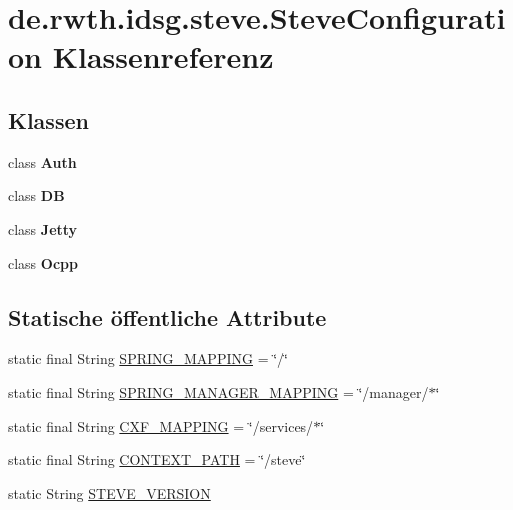 \hypertarget{classde_1_1rwth_1_1idsg_1_1steve_1_1_steve_configuration}{\section{de.\-rwth.\-idsg.\-steve.\-Steve\-Configuration Klassenreferenz}
\label{classde_1_1rwth_1_1idsg_1_1steve_1_1_steve_configuration}
}
\subsection*{Klassen}
\begin{DoxyCompactItemize}
\item 
class {\bfseries Auth}
\item 
class {\bfseries D\-B}
\item 
class {\bfseries Jetty}
\item 
class {\bfseries Ocpp}
\end{DoxyCompactItemize}
\subsection*{Statische öffentliche Attribute}
\begin{DoxyCompactItemize}
\item 
static final String \hyperlink{classde_1_1rwth_1_1idsg_1_1steve_1_1_steve_configuration_aecc681bfa1ab888ae98352bfc28f7384}{S\-P\-R\-I\-N\-G\-\_\-\-M\-A\-P\-P\-I\-N\-G} = \char`\"{}/\char`\"{}
\item 
static final String \hyperlink{classde_1_1rwth_1_1idsg_1_1steve_1_1_steve_configuration_ae72ad42b30d59ffc90be207c36a85479}{S\-P\-R\-I\-N\-G\-\_\-\-M\-A\-N\-A\-G\-E\-R\-\_\-\-M\-A\-P\-P\-I\-N\-G} = \char`\"{}/manager/$\ast$\char`\"{}
\item 
static final String \hyperlink{classde_1_1rwth_1_1idsg_1_1steve_1_1_steve_configuration_ae158db01245b410e0e718a7408f5c3e5}{C\-X\-F\-\_\-\-M\-A\-P\-P\-I\-N\-G} = \char`\"{}/services/$\ast$\char`\"{}
\item 
static final String \hyperlink{classde_1_1rwth_1_1idsg_1_1steve_1_1_steve_configuration_a47f50a365d3a7d2b50e565b9add471e2}{C\-O\-N\-T\-E\-X\-T\-\_\-\-P\-A\-T\-H} = \char`\"{}/steve\char`\"{}
\item 
static String \hyperlink{classde_1_1rwth_1_1idsg_1_1steve_1_1_steve_configuration_ab5b05aa586a942e62939aa9b25d4edf9}{S\-T\-E\-V\-E\-\_\-\-V\-E\-R\-S\-I\-O\-N}
\end{DoxyCompactItemize}


